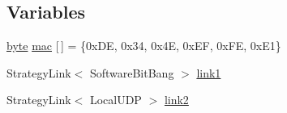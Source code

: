 \subsection*{Variables}
\begin{DoxyCompactItemize}
\item 
\hyperlink{Arduino_8h_ab8ef12fab634c171394422d0ee8baf94}{byte} \hyperlink{BlinkingSwitch_8ino_aea3f7775fecafb66a619eb2dcb0357bd}{mac} \mbox{[}$\,$\mbox{]} = \{0x\-D\-E, 0x34, 0x4\-E, 0x\-E\-F, 0x\-F\-E, 0x\-E1\}
\item 
Strategy\-Link$<$ Software\-Bit\-Bang $>$ \hyperlink{BlinkingSwitch_8ino_a23282b44f676e7ce4d3df2e799b6a78c}{link1}
\item 
Strategy\-Link$<$ Local\-U\-D\-P $>$ \hyperlink{BlinkingSwitch_8ino_a3738aed90e382efb2532449d7e152c7b}{link2}
\end{DoxyCompactItemize}


